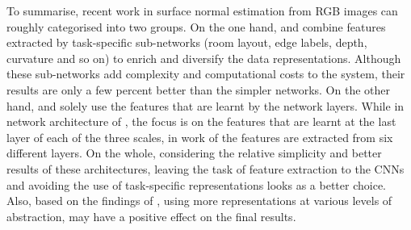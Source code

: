 To summarise, recent work in surface normal estimation from RGB images can roughly categorised into two groups. On the one hand, \citeauthor*{wang} \cite{wang} and \citeauthor*{dharmasiri} \cite{dharmasiri} combine features extracted by task-specific sub-networks (room layout, edge labels, depth, curvature and so on) to enrich and diversify the data representations. Although these sub-networks add complexity and computational costs to the system, their results are only a few percent better than the simpler networks. On the other hand, \citeauthor*{eigen} \cite{eigen} and \citeauthor*{bansal} \cite{bansal} solely use the features that are learnt by the network layers. While in network architecture of \citeauthor*{eigen}\cite{eigen}, the focus is on the features that are learnt at the last layer of each of the three scales, in work of \citeauthor*{bansal} the features are extracted from six different layers. On the whole, considering the relative simplicity and better results of these architectures, leaving the task of feature extraction to the CNNs and avoiding the use of task-specific representations looks as a better choice. Also, based on the findings of \citeauthor*{bansal}\cite{bansal}, using more representations at various levels of abstraction, may have a positive effect on the final results. 